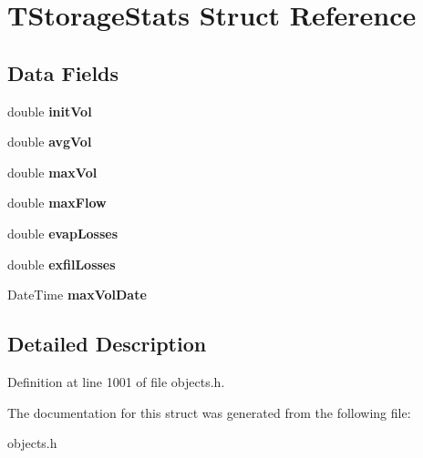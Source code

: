 \hypertarget{struct_t_storage_stats}{}\section{T\+Storage\+Stats Struct Reference}
\label{struct_t_storage_stats}
\subsection*{Data Fields}
\begin{DoxyCompactItemize}
\item 
\mbox{\label{struct_t_storage_stats_a90b727966ced13ac3a031a4c01145162}} 
double {\bfseries init\+Vol}
\item 
\mbox{\label{struct_t_storage_stats_a317728f69e66a8c0144825d405794c54}} 
double {\bfseries avg\+Vol}
\item 
\mbox{\label{struct_t_storage_stats_aec31a605aaec87035c1502d8d7c84090}} 
double {\bfseries max\+Vol}
\item 
\mbox{\label{struct_t_storage_stats_a50e437bc9d75ebd303d3e48e56416ad3}} 
double {\bfseries max\+Flow}
\item 
\mbox{\label{struct_t_storage_stats_a45250f515691e53d2dd9ac67b5e0ca35}} 
double {\bfseries evap\+Losses}
\item 
\mbox{\label{struct_t_storage_stats_af733a3c350a0feea8eb0faa4cd15d070}} 
double {\bfseries exfil\+Losses}
\item 
\mbox{\label{struct_t_storage_stats_a7793b171d61b36f2b76441faf575c92f}} 
Date\+Time {\bfseries max\+Vol\+Date}
\end{DoxyCompactItemize}


\subsection{Detailed Description}


Definition at line 1001 of file objects.\+h.



The documentation for this struct was generated from the following file\+:\begin{DoxyCompactItemize}
\item 
objects.\+h\end{DoxyCompactItemize}
